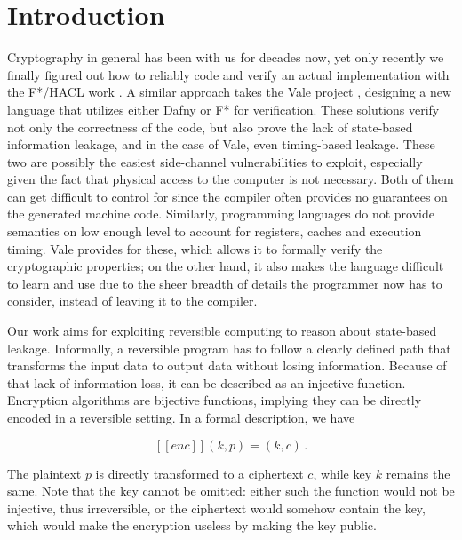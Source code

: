 \documentclass[a4paper,10pt,openright]{memoir}
\def\enc{\ensuremath{\mathit{enc}}}
\newcommand{\exe}[1]{\ensuremath{[\![#1]\!]}}
\begin{document}
\chapter{Introduction}


Cryptography in general has been with us for decades now, yet only 
recently we finally figured out how to reliably code and verify an 
actual implementation with the F*/HACL work \cite{HACL}. A similar 
approach takes the Vale project \cite{Vale}, designing a new language 
that utilizes either Dafny or F* for verification. These solutions 
verify not only the correctness of the code, but also prove the lack of 
state-based information leakage, and in the case of Vale, even 
timing-based leakage. These two are possibly the easiest side-channel 
vulnerabilities to exploit, especially given the fact that physical 
access to the computer is not necessary. Both of them can get difficult 
to control for since the compiler often provides no guarantees on the 
generated machine code. Similarly, programming languages do not provide 
semantics on low enough level to account for registers, caches and 
execution timing. Vale provides for these, which allows it to formally 
verify the cryptographic properties; on the other hand, it also makes 
the language difficult to learn and use due to the sheer breadth of 
details the programmer now has to consider, instead of leaving it to 
the compiler.

Our work aims for exploiting reversible computing to reason about 
state-based leakage. Informally, a reversible program has to follow a 
clearly defined path that transforms the input data to output data 
without losing information. Because of that lack of information loss, 
it can be described as an injective function. Encryption algorithms are 
bijective functions, implying they can be directly encoded in a 
reversible setting. In a formal description, we have

$$
\exe{\enc}(k,p) = (k,c) \,.
$$

The plaintext $p$ is directly transformed to a ciphertext $c$, while 
key $k$ remains the same. Note that the key cannot be omitted: either 
such the function would not be injective, thus irreversible, or the 
ciphertext would somehow contain the key, which would make the 
encryption useless by making the key public. 
\end{document}
